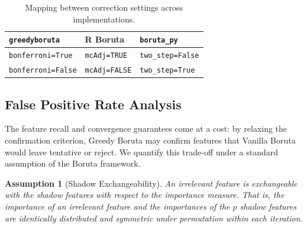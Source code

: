 \documentclass[runningheads]{llncs}
\newtheorem{assumption}{Assumption}
\begin{document}
\begin{table}[t]
\centering
\caption{Mapping between correction settings across implementations.}
\label{tab:correction_mapping}
\begin{tabular}{lll}
\toprule
\texttt{greedyboruta} & R Boruta & \texttt{boruta\_py} \\
\midrule
\texttt{bonferroni=True}  & \texttt{mcAdj=TRUE}  & \texttt{two\_step=False} \\
\texttt{bonferroni=False} & \texttt{mcAdj=FALSE} & \texttt{two\_step=True}\footnotemark \\
\bottomrule
\end{tabular}
\end{table}



\subsection{False Positive Rate Analysis}
\label{sec:method:fpr}

The feature recall and convergence guarantees come at a cost: by relaxing the confirmation criterion, Greedy Boruta may confirm features that Vanilla Boruta would leave tentative or reject. We quantify this trade-off under a standard assumption of the Boruta framework.

\begin{assumption}[Shadow Exchangeability]
\label{asm:exchangeability}
An irrelevant feature is exchangeable with the shadow features with respect to the importance measure. That is, the importance of an irrelevant feature and the importances of the $p$ shadow features are identically distributed and symmetric under permutation within each iteration.
\end{assumption}

\end{document}
